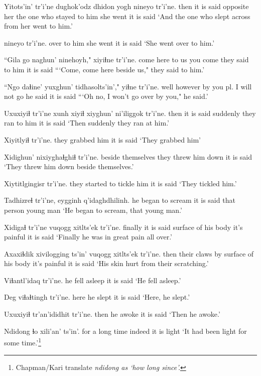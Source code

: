 \documentclass[12pt]{article}
\begin{document}
\gll Yitots'in' tr'i'ne dughok'odz  dhidon yogh nineyo tr'i'ne.
then  {it is said} {opposite her} {the one who stayed} {to him} {she went} {it is said}
\glt `And the one who slept across from her went to him.'
\glend

 nineyo tr'i'ne.
{over to him} {she went} {it is said}
\glt `She went over to him.'
\glend

\gll ``Gila go naghun' ninehoyh," xiyiɬne  tr'i'ne.
come here {to us} {you come} {they said to him} {it is said}
\glt ```Come, come here beside us," they said to him.'
\glend

\gll ``Ngo daɬine' yuxghun' {tidhasolts'in',"} yiɬne tr'i'ne.
well however {by you pl.} {I will not go}  {he said} {it is said}
\glt ```Oh no, I won't go over by you," he said.'
\glend

\gll Uxuxiyiɬ tr'i'ne {xunh xiyiɬ} {xiyghun' ni'iliggok} tr'i'ne.
then  {it is said} suddenly {they ran to him} {it is said}
\glt `Then suddenly they ran at him.'
\glend

\gll Xiyitlyiɬ  tr'i'ne.
{they grabbed him} {it is said}
\glt `They grabbed him'
\glend

\gll Xidighun' nixiyghaɬghiɬ tr'i'ne.
{beside themselves} {they threw him down} {it is said}
\glt `They threw him down beside themselves.'
\glend

\gll Xiytitlgingisr tr'i'ne.
{they started to tickle him} {it is said}
\glt `They tickled him.'
\glend

\gll Tadhizreɬ  tr'i'ne, eygginh q'idaghdhilinh.
{he began to scream} {it is said} {that person} {young man}
\glt `He began to scream, that young man.'
\glend

\gll Xidigaɬ tr'i'ne vuqogg xitlts'ek tr'i'ne.
finally  {it is said} {surface of his body} {it's painful} {it is said}
\glt `Finally he was in great pain all over.'
\glend

\gll Axaxiɬdik xivilogging ts'in' vuqogg xitlts'ek tr'i'ne.
then  {their claws} by {surface of his body} {it's painful} {it is said}
\glt `His skin hurt from their scratching.'
\glend

\gll Viɬantl'idaq tr'i'ne.
{he fell asleep} {it is said}
\glt `He fell asleep.'
\glend

\gll Deg viɬaɬtingh tr'i'ne.
here {he slept} {it is said}
\glt `Here, he slept.'
\glend

\gll Uxuxiyiɬ tr'an'ididhit tr'i'ne.
then  {he awoke} {it is said}
\glt `Then he awoke.'
\glend

\gll Ndidong  ɬo xili'an' ts'in'.
{for a long time} indeed {it is light}
\glt `It had been light for some time.'\footnote{Chapman/Kari translate \em ndidong \em as `how long since'.}
\glend
\end{document}
